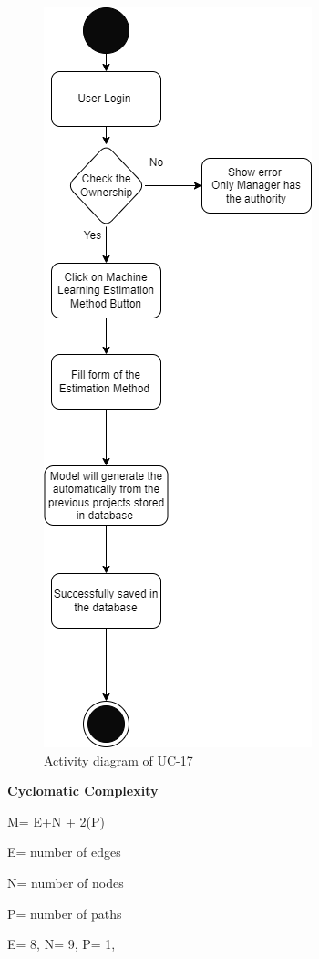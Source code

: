 \begin{figure}[H]
    \centering
    \includegraphics[scale=0.7]{./diagrams/Activity Diagram/ad-17.png}
    \caption{Activity diagram of UC-17}
    \label{fig:act-17}

\end{figure}

\textbf{Cyclomatic Complexity}

M= E+N + 2(P)

E= number of edges

N= number of nodes

P= number of paths

E= 8,
N= 9,
P= 1,

